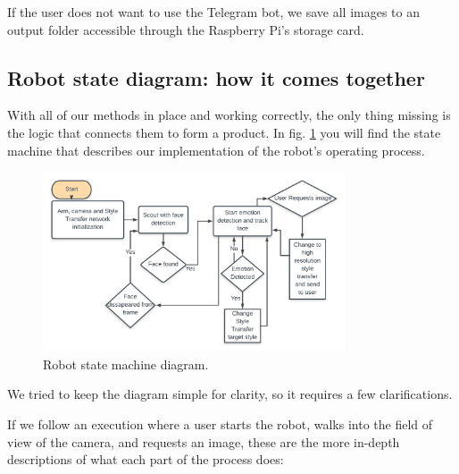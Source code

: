 If the user does not want to use the Telegram bot, we save all images to an output folder accessible through the Raspberry Pi's storage card.


\subsection{Robot state diagram: how it comes together}

With all of our methods in place and working correctly, the only thing missing is the logic that connects them to form a product. In fig. \ref{fig:state_machine} you will find the state machine that describes our implementation of the robot's operating process. 



\begin{figure}[hb]
  \centering
  \includegraphics[width=0.8\textwidth]{resources/state_machine.png}
  \caption{Robot state machine diagram.}\label{fig:state_machine}
\end{figure}

We tried to keep the diagram simple for clarity, so it requires a few clarifications.

If we follow an execution where a user starts the robot, walks into the field of view of the camera, and requests an image, these are the more in-depth descriptions of what each part of the process does:

